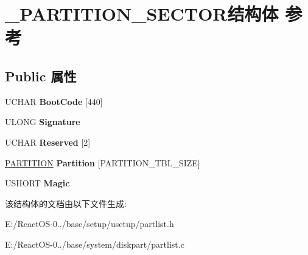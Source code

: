 \hypertarget{struct___p_a_r_t_i_t_i_o_n___s_e_c_t_o_r}{}\section{\+\_\+\+P\+A\+R\+T\+I\+T\+I\+O\+N\+\_\+\+S\+E\+C\+T\+O\+R结构体 参考}
\label{struct___p_a_r_t_i_t_i_o_n___s_e_c_t_o_r}
\subsection*{Public 属性}
\begin{DoxyCompactItemize}
\item 
\mbox{\label{struct___p_a_r_t_i_t_i_o_n___s_e_c_t_o_r_aa015d24b0b7ce4af5d51e725fc3ae905}} 
U\+C\+H\+AR {\bfseries Boot\+Code} \mbox{[}440\mbox{]}
\item 
\mbox{\label{struct___p_a_r_t_i_t_i_o_n___s_e_c_t_o_r_ac690cb7eb767edcd9903c28aa7f1410a}} 
U\+L\+O\+NG {\bfseries Signature}
\item 
\mbox{\label{struct___p_a_r_t_i_t_i_o_n___s_e_c_t_o_r_aa5529b1961bb92e8991c59fa803ecc1e}} 
U\+C\+H\+AR {\bfseries Reserved} \mbox{[}2\mbox{]}
\item 
\mbox{\label{struct___p_a_r_t_i_t_i_o_n___s_e_c_t_o_r_af13a09f34e5e3ae8ed1a94e4d64d34dc}} 
\hyperlink{struct___p_a_r_t_i_t_i_o_n}{P\+A\+R\+T\+I\+T\+I\+ON} {\bfseries Partition} \mbox{[}P\+A\+R\+T\+I\+T\+I\+O\+N\+\_\+\+T\+B\+L\+\_\+\+S\+I\+ZE\mbox{]}
\item 
\mbox{\label{struct___p_a_r_t_i_t_i_o_n___s_e_c_t_o_r_a218830a0094b21e7ad1ddb7af8a28f9b}} 
U\+S\+H\+O\+RT {\bfseries Magic}
\end{DoxyCompactItemize}


该结构体的文档由以下文件生成\+:\begin{DoxyCompactItemize}
\item 
E\+:/\+React\+O\+S-\/0../base/setup/usetup/partlist.\+h\item 
E\+:/\+React\+O\+S-\/0../base/system/diskpart/partlist.\+c\end{DoxyCompactItemize}

